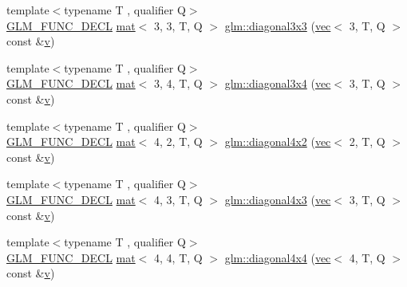 \begin{DoxyCompactItemize}
\item 
{\footnotesize template$<$typename T , qualifier Q$>$ }\\\mbox{\hyperlink{setup_8hpp_ab2d052de21a70539923e9bcbf6e83a51}{G\+L\+M\+\_\+\+F\+U\+N\+C\+\_\+\+D\+E\+CL}} \mbox{\hyperlink{structglm_1_1mat}{mat}}$<$ 3, 3, T, Q $>$ \mbox{\hyperlink{group__gtx__matrix__operation_ga5487ff9cdbc8e04d594adef1bcb16ee0}{glm\+::diagonal3x3}} (\mbox{\hyperlink{structglm_1_1vec}{vec}}$<$ 3, T, Q $>$ const \&\mbox{\hyperlink{_s_d_l__opengl_8h_a10a82eabcb59d2fcd74acee063775f90}{v}})
\item 
{\footnotesize template$<$typename T , qualifier Q$>$ }\\\mbox{\hyperlink{setup_8hpp_ab2d052de21a70539923e9bcbf6e83a51}{G\+L\+M\+\_\+\+F\+U\+N\+C\+\_\+\+D\+E\+CL}} \mbox{\hyperlink{structglm_1_1mat}{mat}}$<$ 3, 4, T, Q $>$ \mbox{\hyperlink{group__gtx__matrix__operation_gad7551139cff0c4208d27f0ad3437833e}{glm\+::diagonal3x4}} (\mbox{\hyperlink{structglm_1_1vec}{vec}}$<$ 3, T, Q $>$ const \&\mbox{\hyperlink{_s_d_l__opengl_8h_a10a82eabcb59d2fcd74acee063775f90}{v}})
\item 
{\footnotesize template$<$typename T , qualifier Q$>$ }\\\mbox{\hyperlink{setup_8hpp_ab2d052de21a70539923e9bcbf6e83a51}{G\+L\+M\+\_\+\+F\+U\+N\+C\+\_\+\+D\+E\+CL}} \mbox{\hyperlink{structglm_1_1mat}{mat}}$<$ 4, 2, T, Q $>$ \mbox{\hyperlink{group__gtx__matrix__operation_gacb8969e6543ba775c6638161a37ac330}{glm\+::diagonal4x2}} (\mbox{\hyperlink{structglm_1_1vec}{vec}}$<$ 2, T, Q $>$ const \&\mbox{\hyperlink{_s_d_l__opengl_8h_a10a82eabcb59d2fcd74acee063775f90}{v}})
\item 
{\footnotesize template$<$typename T , qualifier Q$>$ }\\\mbox{\hyperlink{setup_8hpp_ab2d052de21a70539923e9bcbf6e83a51}{G\+L\+M\+\_\+\+F\+U\+N\+C\+\_\+\+D\+E\+CL}} \mbox{\hyperlink{structglm_1_1mat}{mat}}$<$ 4, 3, T, Q $>$ \mbox{\hyperlink{group__gtx__matrix__operation_gae235def5049d6740f0028433f5e13f90}{glm\+::diagonal4x3}} (\mbox{\hyperlink{structglm_1_1vec}{vec}}$<$ 3, T, Q $>$ const \&\mbox{\hyperlink{_s_d_l__opengl_8h_a10a82eabcb59d2fcd74acee063775f90}{v}})
\item 
{\footnotesize template$<$typename T , qualifier Q$>$ }\\\mbox{\hyperlink{setup_8hpp_ab2d052de21a70539923e9bcbf6e83a51}{G\+L\+M\+\_\+\+F\+U\+N\+C\+\_\+\+D\+E\+CL}} \mbox{\hyperlink{structglm_1_1mat}{mat}}$<$ 4, 4, T, Q $>$ \mbox{\hyperlink{group__gtx__matrix__operation_ga0b4cd8dea436791b072356231ee8578f}{glm\+::diagonal4x4}} (\mbox{\hyperlink{structglm_1_1vec}{vec}}$<$ 4, T, Q $>$ const \&\mbox{\hyperlink{_s_d_l__opengl_8h_a10a82eabcb59d2fcd74acee063775f90}{v}})
\end{DoxyCompactItemize}


